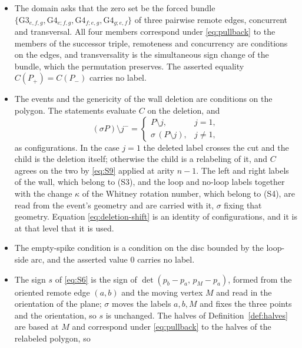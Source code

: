 \begin{axiom}
\begin{itemize}
  every case above preserves; the two sign changes are changes of the
  representative, not of the geometry.
\item[(S2)] The domain asks that the zero set be the forced bundle
  $\{\mathrm{G3}_{e,f,g},\mathrm{G4}_{e;f,g},\mathrm{G4}_{f;e,g},
  \mathrm{G4}_{g;e,f}\}$ of three pairwise remote edges, concurrent and
  transversal. All four members correspond under \eqref{eq:pullback} to the
  members of the successor triple, remoteness and concurrency are conditions on
  the edges, and transversality is the simultaneous sign change of the bundle,
  which the permutation preserves. The asserted equality $C(P_+)=C(P_-)$ carries
  no label.
\item[(S3), (S4)] The events and the genericity of the wall deletion are
  conditions on the polygon. The statements evaluate $C$ on the deletion, and
  \begin{equation}
    (\sigma P)\setminus j^{-}=
    \begin{cases}
      P\setminus j, & j=1,\\[2pt]
      \sigma\,(P\setminus j), & j\neq1,
    \end{cases}
    \label{eq:deletion-shift}
  \end{equation}
  as configurations. In the case $j=1$ the deleted label crosses the cut and the
  child is the deletion itself; otherwise the child is a relabeling of it, and
  $C$ agrees on the two by \eqref{eq:S9} applied at arity $n-1$. The left and
  right labels of the wall, which belong to (S3), and the loop and no-loop
  labels together with the change $\kappa$ of the Whitney rotation number, which
  belong to (S4), are read from the event's geometry and are carried with it,
  $\sigma$ fixing that geometry. Equation \eqref{eq:deletion-shift} is an
  identity of configurations, and it is at that level that it is used.
\item[(S5)] The empty-spike condition is a condition on the disc bounded by the
  loop-side arc, and the asserted value $0$ carries no label.
\item[(S6), (S7)] The sign $s$ of \eqref{eq:S6} is the sign of
  $\det(p_b-p_a,\,p_M-p_a)$, formed from the oriented remote edge $(a,b)$ and
  the moving vertex $M$ and read in the orientation of the plane; $\sigma$ moves
  the labels $a,b,M$ and fixes the three points and the orientation, so $s$ is
  unchanged. The halves of Definition~\ref{def:halves} are based at $M$ and
  correspond under \eqref{eq:pullback} to the halves of the relabeled polygon,
  so
  \begin{equation}

\end{equation}
\end{itemize}
\end{axiom}
